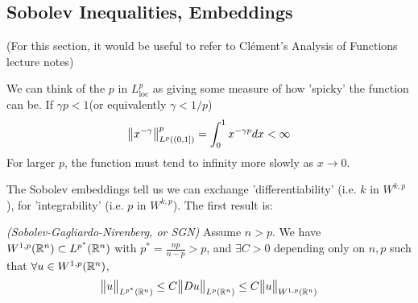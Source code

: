\documentclass[10pt,a4paper]{report}
\begin{document}
\subsection*{Sobolev Inequalities, Embeddings}

(For this section, it would be useful to refer to Cl\'{e}ment's Analysis of Functions lecture notes)
\s

We can think of the $p$ in $L^p_{\text{loc}}$ as giving some measure of how 'spicky' the function can be. If $\gamma p <1$(or equivalently $\gamma <1/p$)
\begin{align*}
\bigl\lVert x^{-\gamma}\bigr\rVert_{L^p((0,1])}^p = \int_0^1 x^{-\gamma p} dx < \infty
\end{align*}
For larger $p$, the function must tend to infinity more slowly as $x\rightarrow 0$.
\s

The Sobolev embeddings tell us we can exchange 'differentiability' (i.e. $k$ in $W^{k,p}$), for 'integrability' (i.e. $p$ in $W^{k,p}$). The first result is:
\s

\thm \emph{(Sobolev-Gagliardo-Nirenberg, or SGN)} Assume $n>p$. We have $W^{1,p}(\mathbb{R}^n) \subset L^{p^*} (\mathbb{R}^n)$ with $p^* = \frac{np}{n-p}>p$, and $\exists C >0$ depending only on $n,p$ such that $\forall u \in W^{1,p}(\mathbb{R}^n)$,
\begin{align*}
\bigl\lVert u\bigr\rVert_{L^{p^*}(\mathbb{R}^n)} \leq C \bigl\lVert Du\bigr\rVert_{L^p(\mathbb{R}^n)} \leq C\bigl\lVert u\bigr\rVert_{W^{1,p}(\mathbb{R}^n)}
\end{align*}
\s
\end{document}
